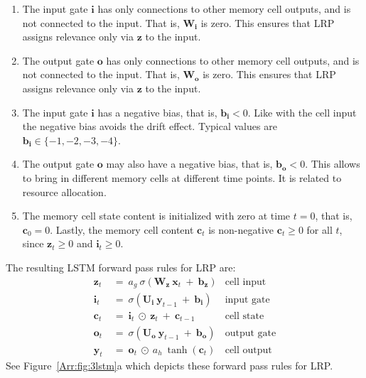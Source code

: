 \documentclass[runningheads]{llncs}
\newcommand\Bb{\bm{b}}%
\newcommand\Bc{\bm{c}}%
\newcommand\Bi{\bm{i}}%
\newcommand\Bo{\bm{o}}%
\newcommand\Bx{\bm{x}}%
\newcommand\By{\bm{y}}%
\newcommand\Bz{\bm{z}}%
\newcommand\BU{\bm{U}}%
\newcommand\BW{\bm{W}}%
\begin{document}
\begin{enumerate}[label=\textbf{(A\arabic*)}]
\item The input gate $\Bi$ has only connections to other memory cell outputs, and is not connected to the input. That is,
  $\BW_{\Bi}$ is zero. This ensures
  that LRP assigns relevance only via $\Bz$ to the input.

\item The output gate $\Bo$ has only connections to other memory cell outputs, and is not connected to the input. That is,
  $\BW_{\Bo}$ is zero. This ensures
  that LRP assigns relevance only via $\Bz$ to the input.

\item The input gate $\Bi$ has a negative bias, that is,
  $\Bb_{\Bi}<0$. Like with the cell input the negative bias
  avoids the drift effect.
  Typical values are $\Bb_{\Bi} \in \{-1,-2,-3,-4\}$.

\item The output gate $\Bo$ may also have a negative bias, that is,
  $\Bb_{\Bo}<0$. This allows to bring in different memory cells at
  different time points. It is related to resource allocation.
  
\item The memory cell state content is initialized with zero at time $t=0$,
  that is, $\Bc_0=0$. Lastly, the memory cell content $\Bc_t$ 
  is non-negative $\Bc_t \geq 0$ for all $t$, since 
  $\Bz_t \geq 0$ and $\Bi_t \geq 0$.
 
\end{enumerate}

The resulting LSTM forward pass rules for LRP are:
\begin{align}
\Bz_t \ &= \ a_g \ \sigma \left( \BW_{\Bz} \ \Bx_t \ + \
   \Bb_{\Bz}\right) & \text{cell input} \\
\Bi_t \ &= \ \sigma \left( \BU_{\Bi} \ \By_{t-1}\ + \
    \Bb_{\Bi} \right) & \text{input gate} \\
\Bc_t \ &= \  \Bi_t \ \odot \ \Bz_t \ + \ \Bc_{t-1} & \text{cell state} \\
\Bo_t \ &= \ \sigma \left( \BU_{\Bo} \ \By_{t-1} \ + \
  \Bb_{\Bo} \right) & \text{output gate} \\
\By_t \ &= \ \Bo_t \ \odot \ a_h \ \tanh\left( \Bc_t \right) &
\text{cell output}
\end{align}
See Figure~\ref{Arr:fig:3lstm}a which depicts these  
forward pass rules for LRP. 
\end{document}
